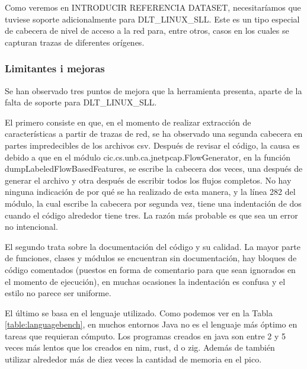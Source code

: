 Como veremos en INTRODUCIR REFERENCIA DATASET, necesitaríamos que tuviese soporte adicionalmente para DLT\_LINUX\_SLL. Este es un tipo especial de cabecera de nivel de acceso a la red para, entre otros, casos en los cuales se capturan trazas de diferentes orígenes.

\subsubsection{Limitantes i mejoras}

Se han observado tres puntos de mejora que la herramienta presenta, aparte de la falta de soporte para DLT\_LINUX\_SLL.

El primero consiste en que, en el momento de realizar extracción de características a partir de trazas de red, se ha observado una segunda cabecera en partes impredecibles de los archivos csv. Después de revisar el código, la causa es debido a que en el módulo cic.cs.unb.ca.jnetpcap.FlowGenerator, en la función dumpLabeledFlowBasedFeatures, se escribe la cabecera dos veces, una después de generar el archivo y otra después de escribir todos los flujos completos. No hay ninguna indicación de por qué se ha realizado de esta manera, y la línea 282 del módulo, la cual escribe la cabecera por segunda vez, tiene una indentación de dos cuando el código alrededor tiene tres. La razón más probable es que sea un error no intencional.

El segundo trata sobre la documentación del código y su calidad. La mayor parte de funciones, clases y módulos se encuentran sin documentación, hay bloques de código comentados (puestos en forma de comentario para que sean ignorados en el momento de ejecución), en muchas ocasiones la indentación es confusa y el estilo no parece ser uniforme. 

El último se basa en el lenguaje utilizado. Como podemos ver en la Tabla \ref{table:languagebench}, en muchos entornos Java no es el lenguaje más óptimo en tareas que requieran cómputo. Los programas creados en java son entre 2 y 5 veces más lentos que los creados en nim, rust, d o zig. Además de también utilizar alrededor más de diez veces la cantidad de memoria en el pico.

